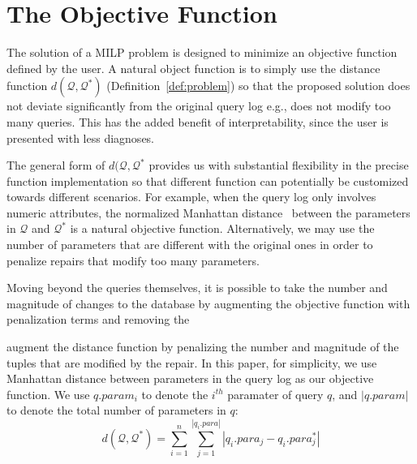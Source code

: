 \section{The Objective Function}

The solution of a MILP problem is designed to minimize an objective function defined by the user.
A natural object function is to simply use the distance function $d(\mathcal{Q}, \mathcal{Q}^*)$ 
(Definition~\ref{def:problem}) so that the proposed solution
does not deviate significantly from the original query log e.g., does not modify too many queries.  
This has the added benefit of interpretability, since the user is presented with less diagnoses.

The general form of $d(\mathcal{Q}, \mathcal{Q}^*$ provides us with substantial flexibility in the precise
function implementation so that different function can potentially be customized towards different scenarios.
For example, when the query log only involves numeric attributes, 
the normalized Manhattan distance~\cite{manhattan} between the parameters 
in $\mathcal{Q}$ and $\mathcal{Q}^*$ is a natural objective function.
Alternatively, we may use the number of parameters that are different with the original ones 
in order to penalize repairs that modify too many parameters. 

Moving beyond the queries themselves,  it is possible to take the number and magnitude of changes
to the database by augmenting the objective function with penalization terms and removing the 

augment the distance function
by penalizing the number and magnitude of the tuples that are modified by the repair.
In this paper, for simplicity, we use Manhattan distance between parameters 
in the query log as our objective function.  We use $q.param_i$ to denote the $i^{th}$ paramater of query $q$,
and $|q.param|$ to denote the total number of parameters in $q$:
\[d(\mathcal{Q}, \mathcal{Q}^*) = \sum_{i = 1} ^{n} \sum_{j = 1}^{|q_i.para|} |q_i.para_j - q_i.para_j^*|\]

% 
% 
% 
